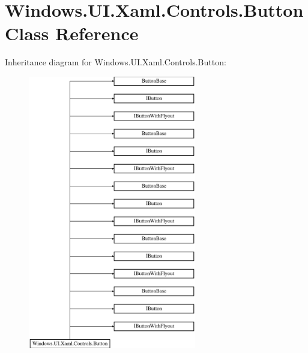 \hypertarget{class_windows_1_1_u_i_1_1_xaml_1_1_controls_1_1_button}{}\section{Windows.\+U\+I.\+Xaml.\+Controls.\+Button Class Reference}
\label{class_windows_1_1_u_i_1_1_xaml_1_1_controls_1_1_button}
Inheritance diagram for Windows.\+U\+I.\+Xaml.\+Controls.\+Button\+:\begin{figure}[H]
\begin{center}
\leavevmode
\includegraphics[height=12.000000cm]{class_windows_1_1_u_i_1_1_xaml_1_1_controls_1_1_button}
\end{center}
\end{figure}
